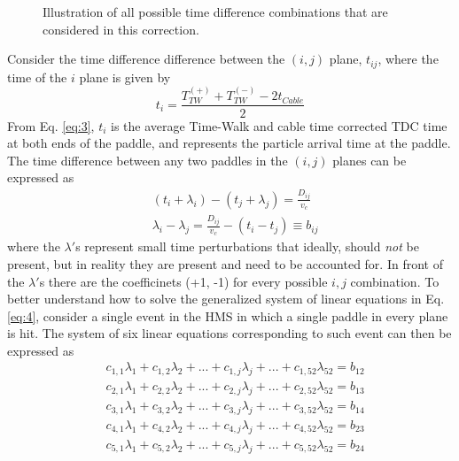 \documentclass[14pt]{article}
\begin{document}
\begin{itemize}
\begin{figure}[H]
    \caption{Illustration of all possible time difference combinations that are considered in this correction.}
    \label{fig:hod_planes}
\end{figure}
Consider the time difference difference between the $(i,j)$ plane, $t_{ij}$, where the time of the $i$ plane is
given by
\begin{equation}\label{eq:3}
  t_{i} = \frac{T^{(+)}_{TW} + T^{(-)}_{TW} - 2t_{Cable}}{2} 
\end{equation}
From Eq. \ref{eq:3}, $t_{i}$ is the average Time-Walk and cable time corrected TDC time at both ends of the paddle,
and represents the particle arrival time at the paddle. The time difference between any two paddles in the $(i,j)$
planes can be expressed as
\begin{equation} \label{eq:4}
\begin{split}
  &(t_{i} + \lambda_{i}) - (t_{j} + \lambda_{j}) = \frac{D_{ij}}{v_{c}} \\
  &\lambda_{i} - \lambda_{j} = \frac{D_{ij}}{v_{c}} - (t_{i} - t_{j}) \equiv b_{ij}
\end{split}
\end{equation}
where the $\lambda'$s represent small time perturbations that ideally, should \textit{not} be present, but in
reality they are present and need to be accounted for. In front of the $\lambda'$s there are the coefficinets (+1, -1) for
every possible $i,j$ combination. To better understand how to solve the generalized system of linear equations in
Eq. \ref{eq:4}, consider a single event in the HMS in which a single paddle in every plane is hit. The system of six linear equations
corresponding to such event can then be expressed as
\begin{equation} \label{eq:5}
\begin{split}
  &c_{1,1}\lambda_{1} +  c_{1,2}\lambda_{2} + . . . + c_{1,j}\lambda_{j} + . . . + c_{1,52}\lambda_{52} =  b_{12} \\
  &c_{2,1}\lambda_{1} +  c_{2,2}\lambda_{2} + . . . + c_{2,j}\lambda_{j} + . . . + c_{2,52}\lambda_{52} =  b_{13} \\
  &c_{3,1}\lambda_{1} +  c_{3,2}\lambda_{2} + . . . + c_{3,j}\lambda_{j} + . . . + c_{3,52}\lambda_{52} =  b_{14} \\
  &c_{4,1}\lambda_{1} +  c_{4,2}\lambda_{2} + . . . + c_{4,j}\lambda_{j} + . . . + c_{4,52}\lambda_{52} =  b_{23} \\
  &c_{5,1}\lambda_{1} +  c_{5,2}\lambda_{2} + . . . + c_{5,j}\lambda_{j} + . . . + c_{5,52}\lambda_{52} =  b_{24} \\

\end{split}
\end{equation}
\end{itemize}
\end{document}
